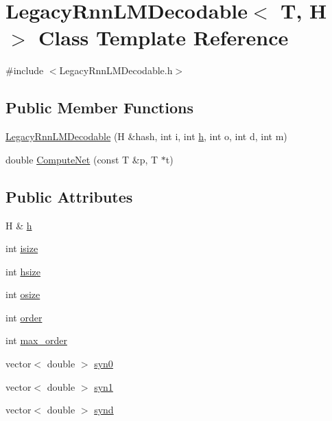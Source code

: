 \hypertarget{class_legacy_rnn_l_m_decodable}{}\section{Legacy\+Rnn\+L\+M\+Decodable$<$ T, H $>$ Class Template Reference}
\label{class_legacy_rnn_l_m_decodable}


{\ttfamily \#include $<$Legacy\+Rnn\+L\+M\+Decodable.\+h$>$}

\subsection*{Public Member Functions}
\begin{DoxyCompactItemize}
\item 
\hyperlink{class_legacy_rnn_l_m_decodable_a50bb311c274d7519125c4b3157b7fe83}{Legacy\+Rnn\+L\+M\+Decodable} (H \&hash, int i, int \hyperlink{class_legacy_rnn_l_m_decodable_a4502b9f9f847792788670709c78965c5}{h}, int o, int d, int m)
\item 
double \hyperlink{class_legacy_rnn_l_m_decodable_a92e0f822fc47655fb83553ee7d4dc849}{Compute\+Net} (const T \&p, T $\ast$t)
\end{DoxyCompactItemize}
\subsection*{Public Attributes}
\begin{DoxyCompactItemize}
\item 
H \& \hyperlink{class_legacy_rnn_l_m_decodable_a4502b9f9f847792788670709c78965c5}{h}
\item 
int \hyperlink{class_legacy_rnn_l_m_decodable_ac899e290ea40c5997b00d3af5de5f7c8}{isize}
\item 
int \hyperlink{class_legacy_rnn_l_m_decodable_a6cd5b4796def7ecc17a96f7cbf8fd76d}{hsize}
\item 
int \hyperlink{class_legacy_rnn_l_m_decodable_aa0d56b9470d32fd716222e69747c3c60}{osize}
\item 
int \hyperlink{class_legacy_rnn_l_m_decodable_a950aa47a348fabd66d93ac224c86f331}{order}
\item 
int \hyperlink{class_legacy_rnn_l_m_decodable_a8ab81cdd5fa61deb053ffd5af6211188}{max\+\_\+order}
\item 
vector$<$ double $>$ \hyperlink{class_legacy_rnn_l_m_decodable_a7970a61748b32b442452cac1ac5e2950}{syn0}
\item 
vector$<$ double $>$ \hyperlink{class_legacy_rnn_l_m_decodable_a1f129bf4f36b2ac9126f05b7c9c8e8c3}{syn1}
\item 
vector$<$ double $>$ \hyperlink{class_legacy_rnn_l_m_decodable_a96b89f4d7e8b92da114cdf0db630b500}{synd}
\end{DoxyCompactItemize}



